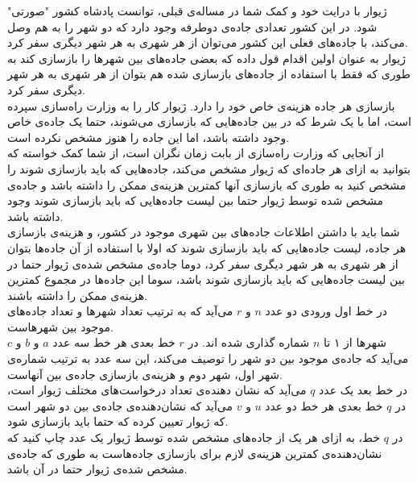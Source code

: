 \documentclass[11.5pt,a4paper,oneside]{article}
\begin{document}
\def\problemCode{Repairing Roads}
\def\problemEnglishTitle{Repairing Roads}
\def\problemFarsiTitle{بازسازی جاده‌ها}
\def\timeLimit{$2$ \second}
\def\memLimit{$256$ \megabytes}
\begin{problem}
ژیوار با درایت خود و کمک شما در مساله‌ی قبلی، توانست پادشاه کشور "صورتی" شود. در این کشور تعدادی جاده‌ی دوطرفه‌ وجود دارد که دو شهر را به هم وصل می‌کند، با جاده‌های فعلی این کشور می‌توان از هر شهری به هر شهر دیگری سفر کرد.\\
ژیوار به عنوان اولین اقدام قول داده که بعضی جاده‌های بین شهر‌ها را بازسازی کند به طوری که فقط با استفاده از جاده‌های بازسازی شده هم بتوان از هر شهری به هر شهر دیگری سفر کرد.\\
بازسازی هر جاده هزینه‌ی خاص خود را دارد. ژیوار کار را به وزارت راه‌سازی سپرده است، اما با یک شرط که در بین جاده‌هایی که باز‌سازی می‌شوند، حتما یک جاده‌ی خاص وجود داشته باشد، اما این جاده‌ را هنوز مشخص نکرده است.\\
از آنجایی که وزارت راه‌سازی از بابت زمان نگران است، از شما کمک خواسته که بتوانید به ازای هر جاده‌ای که ژیوار مشخص می‌کند، جاده‌هایی که باید بازسازی شوند را مشخص کنید به طوری که بازسازی آنها کمترین هزینه‌ی ممکن را داشته باشد و جاده‌ی مشخص شده توسط ژیوار حتما بین لیست جاده‌هایی که باید بازسازی شوند وجود داشته باشد.\\
شما باید با داشتن اطلاعات جاده‌های بین شهری موجود در کشور، و هزینه‌ی بازسازی هر جاده، لیست جاده‌هایی که باید بازسازی شوند که اولا با استفاده از آن جاده‌ها بتوان از هر شهری به هر شهر دیگری سفر کرد، دوما جاده‌ی مشخص شده‌ی ژیوار حتما در بین لیست جاده‌هایی که باید بازسازی شوند باشد، سوما این جاده‌ها در مجموع کمترین هزینه‌ی ممکن را داشته باشند.\\

در خط اول ورودی دو عدد $n$ و $r$ می‌آید که به ترتیب تعداد شهر‌ها و تعداد جاده‌های موجود بین شهر‌هاست.\\
شهرها از ۱ تا $n$ شماره گذاری شده اند. در $r$ خط بعدی هر خط سه عدد $a$ و $b$ و $c$ می‌آید که جاده‌ی موجود بین دو شهر را توصیف می‌کند، این سه عدد به ترتیب شماره‌ی شهر اول، شهر دوم و هزینه‌ی بازسازی جاده‌ی بین آنهاست.\\
در خط بعد یک عدد $q$ می‌آید که نشان دهنده‌ی تعداد درخواست‌های مختلف ژیوار است، در $q$ خط بعدی هر خط دو عدد $u$ و $v$ می‌آید که نشان‌دهنده‌ی جاده‌ی بین دو شهر است که ژیوار تعیین کرده که حتما باید بازسازی شود.\\

\outputDescription
در $q$ خط، به ازای هر یک از جاده‌های مشخص شده توسط ژیوار یک عدد چاپ کنید که نشان‌دهنده‌ی کمترین هزینه‌ی لازم برای بازسازی جاده‌هاست به طوری که جاده‌ی مشخص شده‌ی ژیوار حتما در آن باشد.\\


\end{problem}
\end{document}
